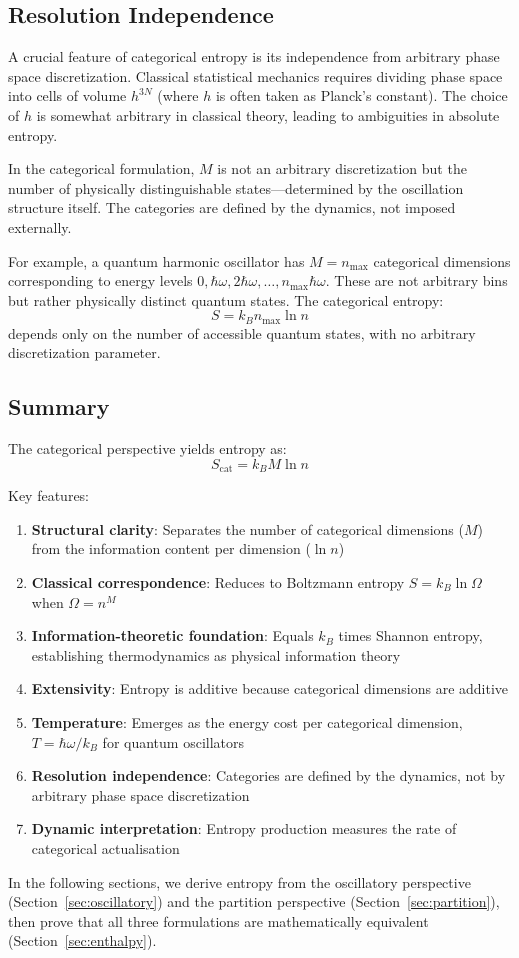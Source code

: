 \subsection{Resolution Independence}

A crucial feature of categorical entropy is its independence from arbitrary phase space discretization. Classical statistical mechanics requires dividing phase space into cells of volume $h^{3N}$ (where $h$ is often taken as Planck's constant). The choice of $h$ is somewhat arbitrary in classical theory, leading to ambiguities in absolute entropy.

In the categorical formulation, $M$ is not an arbitrary discretization but the number of physically distinguishable states—determined by the oscillation structure itself. The categories are defined by the dynamics, not imposed externally.

For example, a quantum harmonic oscillator has $M = n_{\text{max}}$ categorical dimensions corresponding to energy levels $0, \hbar\omega, 2\hbar\omega, \ldots, n_{\text{max}}\hbar\omega$. These are not arbitrary bins but rather physically distinct quantum states. The categorical entropy:
\begin{equation}
S = k_B n_{\text{max}} \ln n
\end{equation}
depends only on the number of accessible quantum states, with no arbitrary discretization parameter.

\subsection{Summary}

The categorical perspective yields entropy as:
\begin{equation}
S_{\text{cat}} = k_B M \ln n
\end{equation}

Key features:
\begin{enumerate}
\item \textbf{Structural clarity}: Separates the number of categorical dimensions ($M$) from the information content per dimension ($\ln n$)
\item \textbf{Classical correspondence}: Reduces to Boltzmann entropy $S = k_B \ln \Omega$ when $\Omega = n^M$
\item \textbf{Information-theoretic foundation}: Equals $k_B$ times Shannon entropy, establishing thermodynamics as physical information theory
\item \textbf{Extensivity}: Entropy is additive because categorical dimensions are additive
\item \textbf{Temperature}: Emerges as the energy cost per categorical dimension, $T = \hbar\omega/k_B$ for quantum oscillators
\item \textbf{Resolution independence}: Categories are defined by the dynamics, not by arbitrary phase space discretization
\item \textbf{Dynamic interpretation}: Entropy production measures the rate of categorical actualisation
\end{enumerate}

In the following sections, we derive entropy from the oscillatory perspective (Section~\ref{sec:oscillatory}) and the partition perspective (Section~\ref{sec:partition}), then prove that all three formulations are mathematically equivalent (Section~\ref{sec:enthalpy}).
